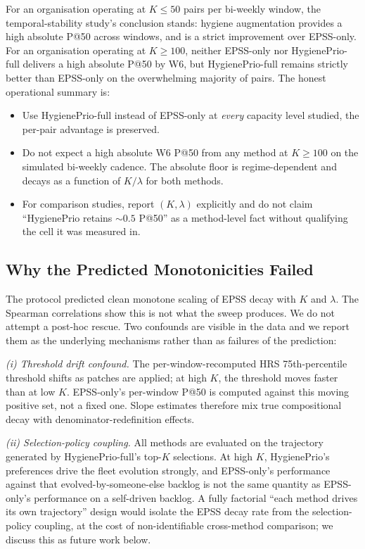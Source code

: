 For an organisation operating at $K \leq 50$ pairs per bi-weekly window,
the temporal-stability study's conclusion stands: hygiene augmentation provides a high
absolute P@50 across windows, and is a strict improvement over EPSS-only.
For an organisation operating at $K \geq 100$, neither EPSS-only nor
HygienePrio-full delivers a high absolute P@50 by W6, but
HygienePrio-full remains strictly better than EPSS-only on the
overwhelming majority of pairs. The honest operational summary is:
\begin{itemize}
\item Use HygienePrio-full instead of EPSS-only at \textit{every}
capacity level studied, the per-pair advantage is preserved.
\item Do not expect a high absolute W6 P@50 from any method at
$K \geq 100$ on the simulated bi-weekly cadence. The absolute floor
is regime-dependent and decays as a function of $K/\lambda$ for
both methods.
\item For comparison studies, report $(K, \lambda)$ explicitly and do
not claim ``HygienePrio retains $\sim 0.5$ P@50'' as a method-level
fact without qualifying the cell it was measured in.
\end{itemize}

\subsection{Why the Predicted Monotonicities Failed}

The protocol predicted clean monotone scaling of EPSS decay with $K$
and $\lambda$. The Spearman correlations show this is not what the
sweep produces. We do not attempt a post-hoc rescue. Two confounds
are visible in the data and we report them as the underlying mechanisms
rather than as failures of the prediction:

\textit{(i) Threshold drift confound.} The per-window-recomputed HRS
75th-percentile threshold shifts as patches are applied; at high $K$,
the threshold moves faster than at low $K$. EPSS-only's per-window
P@50 is computed against this moving positive set, not a fixed one.
Slope estimates therefore mix true compositional decay with
denominator-redefinition effects.

\textit{(ii) Selection-policy coupling.} All methods are evaluated on
the trajectory generated by HygienePrio-full's top-$K$ selections. At
high $K$, HygienePrio's preferences drive the fleet evolution
strongly, and EPSS-only's performance against that
evolved-by-someone-else backlog is not the same quantity as
EPSS-only's performance on a self-driven backlog. A fully factorial
``each method drives its own trajectory'' design would isolate
the EPSS decay rate from the selection-policy coupling, at the cost
of non-identifiable cross-method comparison; we discuss this as future
work below.

